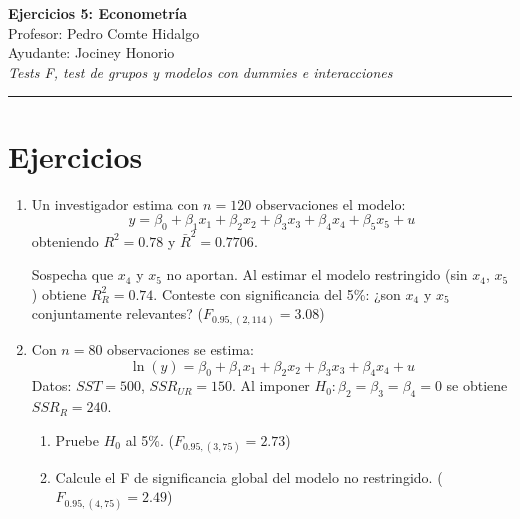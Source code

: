 \documentclass[11pt,a4paper]{article}
\begin{document}
\begin{center}
    {\Large \textbf{Ejercicios 5: Econometría}}\\[0.3cm]
    Profesor: Pedro Comte Hidalgo \\
    Ayudante: Jociney Honorio \\
    \textit{Tests F, test de grupos y modelos con dummies e interacciones}
\end{center}

\vspace{0.3cm}
\hrule
\vspace{0.5cm}

\section{Ejercicios}
\begin{enumerate}
    \item 
Un investigador estima con $n=120$ observaciones el modelo:
\[
y = \beta_0 + \beta_1 x_1 + \beta_2 x_2 + \beta_3 x_3 + \beta_4 x_4 + \beta_5 x_5 + u
\]
obteniendo $R^2 = 0.78$ y $\bar{R}^2 = 0.7706$.

Sospecha que $x_4$ y $x_5$ no aportan. Al estimar el modelo restringido (sin $x_4$, $x_5$) obtiene $R^2_R = 0.74$. Conteste con significancia del 5\%: ¿son $x_4$ y $x_5$ conjuntamente relevantes? ($F_{0.95,(2,114)}=3.08$)


\item Con $n=80$ observaciones se estima:
\[
\ln(y) = \beta_0 + \beta_1 x_1 + \beta_2 x_2 + \beta_3 x_3 + \beta_4 x_4 + u
\]
Datos: $SST = 500$, $SSR_{UR} = 150$. Al imponer $H_0: \beta_2 = \beta_3 = \beta_4 = 0$ se obtiene $SSR_R = 240$.
\begin{enumerate}
    \item[(a)] Pruebe $H_0$ al 5\%. ($F_{0.95,(3,75)}=2.73$)
    \item[(b)] Calcule el F de significancia global del modelo no restringido. ($F_{0.95,(4,75)}=2.49$)
\end{enumerate}


\end{enumerate}
\end{document}
